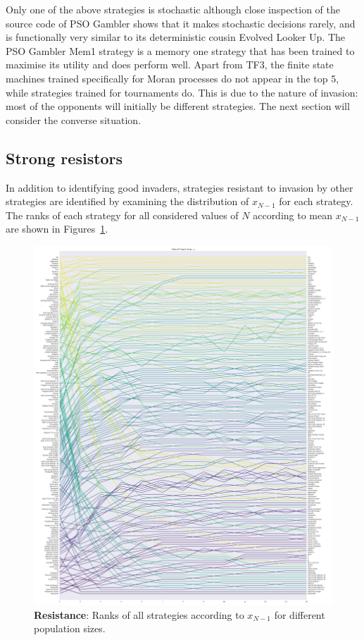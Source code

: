 \documentclass[10pt,journal]{IEEEtran}
\begin{document}
Only one of the above strategies is stochastic although close inspection of the
source code of PSO Gambler shows that it makes stochastic decisions rarely, and
is functionally very similar to its deterministic cousin Evolved Looker Up.
The PSO Gambler Mem1 strategy is a memory one strategy that has been trained to
maximise its utility and does perform well.
Apart from TF3, the finite state machines trained specifically for
Moran processes do not appear in the top 5, while strategies trained for
tournaments do. This is due to the nature of invasion: most of the opponents
will initially be different strategies. The next section will consider the
converse situation.

\subsection{Strong resistors}\label{sec:strong_resistors}

In addition to identifying good invaders, strategies resistant to invasion by
other strategies are identified by examining the distribution of $x_{N-1}$ for
each strategy. The ranks of each strategy for all considered values of \(N\)
according to mean \(x_{N-1}\) are shown in
Figures~\ref{fig:ranks_v_size_resist}.

\begin{figure}[!hbtp]
    \centering
    \includegraphics[width=\columnwidth]{img/average_rank_vs_population_size_resist.pdf}
    \caption{\textbf{Resistance}: Ranks of all strategies according to \(x_{N-1}\) for different
    population sizes.}
    \label{fig:ranks_v_size_resist}
\end{figure}
\end{document}
